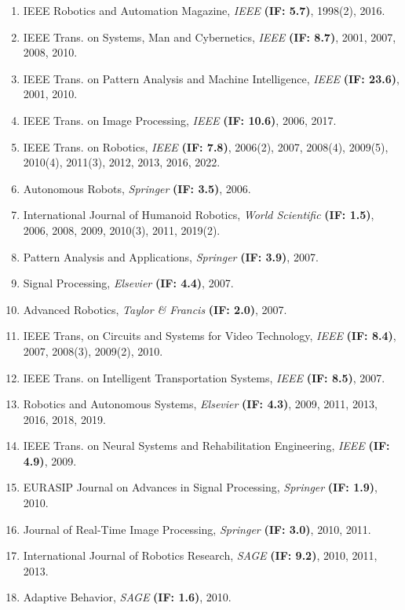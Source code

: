 \documentclass[
]{article}
\begin{document}
\begin{enumerate}
\def\labelenumi{\arabic{enumi}.}
\setcounter{enumi}{2}
\item
  IEEE Robotics and Automation Magazine, \emph{IEEE} \textbf{(IF: 5.7)},
  1998(2), 2016.
\item
  IEEE Trans. on Systems, Man and Cybernetics, \emph{IEEE} \textbf{(IF:
  8.7)}, 2001, 2007, 2008, 2010.
\item
  IEEE Trans. on Pattern Analysis and Machine Intelligence, \emph{IEEE}
  \textbf{(IF: 23.6)}, 2001, 2010.
\item
  IEEE Trans. on Image Processing, \emph{IEEE} \textbf{(IF: 10.6)},
  2006, 2017.
\item
  IEEE Trans. on Robotics, \emph{IEEE} \textbf{(IF: 7.8)}, 2006(2),
  2007, 2008(4), 2009(5), 2010(4), 2011(3), 2012, 2013, 2016, 2022.
\item
  Autonomous Robots, \emph{Springer} \textbf{(IF: 3.5)}, 2006.
\item
  International Journal of Humanoid Robotics, \emph{World Scientific}
  \textbf{(IF: 1.5)}, 2006, 2008, 2009, 2010(3), 2011, 2019(2).
\item
  Pattern Analysis and Applications, \emph{Springer} \textbf{(IF: 3.9)},
  2007.
\item
  Signal Processing, \emph{Elsevier} \textbf{(IF: 4.4)}, 2007.
\item
  Advanced Robotics, \emph{Taylor \& Francis} \textbf{(IF: 2.0)}, 2007.
\item
  IEEE Trans, on Circuits and Systems for Video Technology, \emph{IEEE}
  \textbf{(IF: 8.4)}, 2007, 2008(3), 2009(2), 2010.
\item
  IEEE Trans. on Intelligent Transportation Systems, \emph{IEEE}
  \textbf{(IF: 8.5)}, 2007.
\item
  Robotics and Autonomous Systems, \emph{Elsevier} \textbf{(IF: 4.3)},
  2009, 2011, 2013, 2016, 2018, 2019.
\item
  IEEE Trans. on Neural Systems and Rehabilitation Engineering,
  \emph{IEEE} \textbf{(IF: 4.9)}, 2009.
\item
  EURASIP Journal on Advances in Signal Processing, \emph{Springer}
  \textbf{(IF: 1.9)}, 2010.
\item
  Journal of Real-Time Image Processing, \emph{Springer} \textbf{(IF:
  3.0)}, 2010, 2011.
\item
  International Journal of Robotics Research, \emph{SAGE} \textbf{(IF:
  9.2)}, 2010, 2011, 2013.
\item
  Adaptive Behavior, \emph{SAGE} \textbf{(IF: 1.6)}, 2010.

\end{enumerate}
\end{document}

